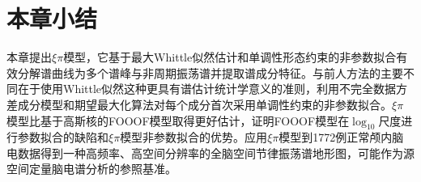 \section{本章小结}
本章提出$\xi\pi$模型，它基于最大Whittle似然估计和单调性形态约束的非参数拟合有效分解谱曲线为多个谱峰与非周期振荡谱并提取谱成分特征。与前人方法的主要不同在于使用Whittle似然这种更具有谱估计统计学意义的准则，利用不完全数据方差成分模型和期望最大化算法对每个成分首次采用单调性约束的非参数拟合。$\xi\pi$模型比基于高斯核的FOOOF模型取得更好估计，证明FOOOF模型在$\log_{10}$尺度进行参数拟合的缺陷和$\xi\pi$模型非参数拟合的优势。应用$\xi\pi$模型到1772例正常颅内脑电数据得到一种高频率、高空间分辨率的全脑空间节律振荡谱地形图，可能作为源空间定量脑电谱分析的参照基准。